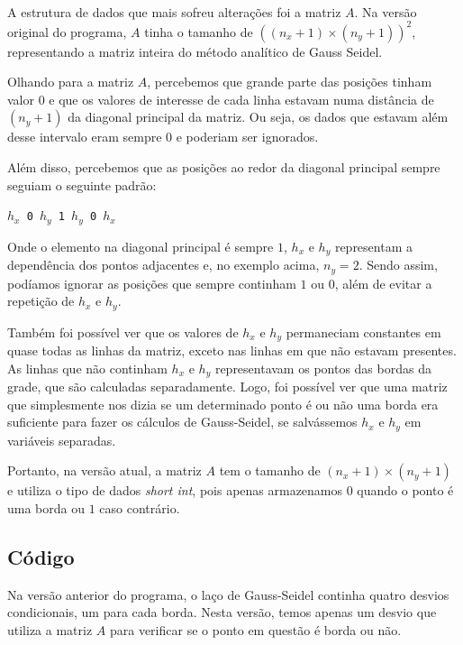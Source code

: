 \documentclass[12pt]{article}
\begin{document}
	\paragraph{}
	A estrutura de dados que mais sofreu alterações foi a matriz $A$.
	Na versão original do programa, $A$ tinha o tamanho de $((n_x+1)\times(n_y+1))^2$, representando a matriz inteira do método analítico de Gauss Seidel.
	
	Olhando para a matriz $A$, percebemos que grande parte das posições tinham valor $0$ e que os valores de interesse de cada linha estavam numa distância de $(n_y+1)$ da diagonal principal da matriz.
	Ou seja, os dados que estavam além desse intervalo eram sempre $0$ e poderiam ser ignorados.
	
	Além disso, percebemos que as posições ao redor da diagonal principal sempre seguiam o seguinte padrão:
	
	\begin{center}
		\texttt{$h_x$ 0 $h_y$ 1 $h_y$ 0 $h_x$}
	\end{center}
	
	Onde o elemento na diagonal principal é sempre $1$, $h_x$ e $h_y$ representam a dependência dos pontos adjacentes e, no exemplo acima, $n_y=2$.
	Sendo assim, podíamos ignorar as posições que sempre continham $1$ ou $0$, além de evitar a repetição de $h_x$ e $h_y$.
	
	Também foi possível ver que os valores de $h_x$ e $h_y$ permaneciam constantes em quase todas as linhas da matriz, exceto nas linhas em que não estavam presentes.
	As linhas que não continham $h_x$ e $h_y$ representavam os pontos das bordas da grade, que são calculadas separadamente.
	Logo, foi possível ver que uma matriz que simplesmente nos dizia se um determinado ponto é ou não uma borda era suficiente para fazer os cálculos de Gauss-Seidel, se salvássemos $h_x$ e $h_y$ em variáveis separadas.
	
	Portanto, na versão atual, a matriz $A$ tem o tamanho de $(n_x+1)\times(n_y+1)$ e utiliza o tipo de dados \emph{short int}, pois apenas armazenamos $0$ quando o ponto é uma borda ou $1$ caso contrário.

	\subsection{Código}
	
	Na versão anterior do programa, o laço de Gauss-Seidel continha quatro desvios condicionais, um para cada borda.
	Nesta versão, temos apenas um desvio que utiliza a matriz $A$ para verificar se o ponto em questão é borda ou não.
	
\end{document}
